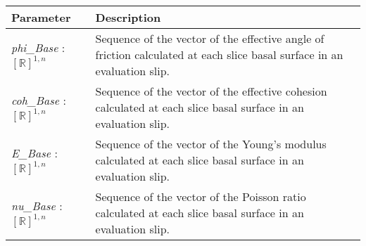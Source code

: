 \documentclass[12pt]{article}
\begin{document}
\begin{center}
\begin{longtable}{p{} p{}}
  \hline \textbf{Parameter} & \textbf{Description} \\ \hline

  \textit{phi\_Base} : $[\mathbb{R}]^{1,n}$ & Sequence of the vector
  of the effective angle of friction calculated at each slice basal
  surface in an evaluation slip.\\

  \textit{coh\_Base} : $[\mathbb{R}]^{1,n}$ & Sequence of the vector
  of the effective cohesion calculated at each slice basal surface in
  an evaluation slip.\\

  \textit{E\_Base} : $[\mathbb{R}]^{1,n}$ & Sequence of the vector of
  the Young's modulus calculated at each slice basal surface in an
  evaluation slip.\\

  \textit{nu\_Base} : $[\mathbb{R}]^{1,n}$ & Sequence of the vector of
  the Poisson ratio calculated at each slice basal surface in an
  evaluation slip.  \\ \hline
\end{longtable}
\end{center}
\end{document}
